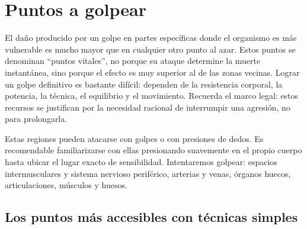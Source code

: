 \chapter{Puntos a golpear}

El daño producido por un golpe en partes específicas donde el organismo es más vulnerable es mucho mayor que en cualquier otro punto al azar. Estos puntos se denominan \enquote{puntos vitales}, no porque su ataque determine la muerte instantánea, sino porque el efecto es muy superior al de las zonas vecinas. Lograr un golpe definitivo es bastante difícil: dependen de la resistencia corporal, la potencia, la técnica, el equilibrio y el movimiento. Recuerda el marco legal: estos recursos se justifican por la necesidad racional de interrumpir una agresión, no para prolongarla.

Estas regiones pueden atacarse con golpes o con presiones de dedos. Es recomendable familiarizarse con ellas presionando suavemente en el propio cuerpo hasta ubicar el lugar exacto de sensibilidad. Intentaremos golpear: espacios intermusculares y sistema nervioso periférico, arterias y venas, órganos huecos, articulaciones, músculos y huesos.

\section{Los puntos más accesibles con técnicas simples}

